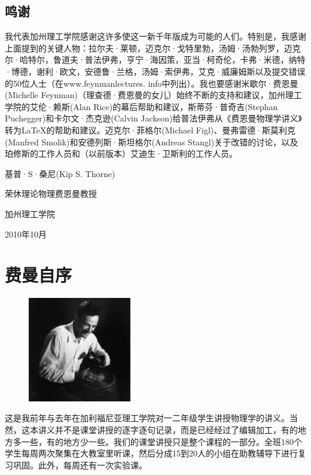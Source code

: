 \documentclass[UTF8, 12pt, a4paper, twoside]{ctexbook}
\begin{document}
\section*{鸣谢}

我代表加州理工学院感谢这许多使这一新千年版成为可能的人们。特别是，我感谢上面提到的关键人物：拉尔夫·莱顿，迈克尔·戈特里勃，汤姆·汤勃列罗，迈克尔·哈特尔，鲁道夫·普法伊弗，亨宁·海因策，亚当·柯奇伦，卡弗·米德，纳特·博德，谢利·欧文，安德鲁·兰格，汤姆·索伊弗，艾克·威廉姆斯以及提交错误的50位人士（在www.feynmanlectures. info中列出）。我也要感谢米歇尔·费恩曼(Michelle Feynman)（理查德·费恩曼的女儿）始终不断的支持和建议，加州理工学院的艾伦·赖斯(Alan Rice)的幕后帮助和建议，斯蒂芬·普奇吉(Stephan Puchegger)和卡尔文·杰克逊(Calvin Jackson)给普法伊弗从《费恩曼物理学讲义》转为\LaTeX 的帮助和建议。迈克尔·菲格尔(Michael Figl)、曼弗雷德·斯莫利克(Manfred Smolik)和安德列斯·斯坦格尔(Andreas Stangl)关于改错的讨论，以及珀修斯的工作人员和（以前版本）艾迪生·卫斯利的工作人员。

\hfill 基普·S·桑尼(Kip S. Thorne)

\hfill 荣休理论物理费恩曼教授

\hfill 加州理工学院

\hfill 2010年10月

\chapter*{费曼自序}

\begin{figure}
    \centering
    \includegraphics[width=0.4\textwidth]{Chapter0/Feynman}
\end{figure}
这是我前年与去年在加利福尼亚理工学院对一二年级学生讲授物理学的讲义。当然，这本讲义并不是课堂讲授的逐字逐句记录，而是已经经过了编辑加工，有的地方多一些，有的地方少一些。我们的课堂讲授只是整个课程的一部分。全班180个学生每周两次聚集在大教室里听课，然后分成15到20人的小组在助教辅导下进行复习巩固。此外，每周还有一次实验课。
\end{document}
